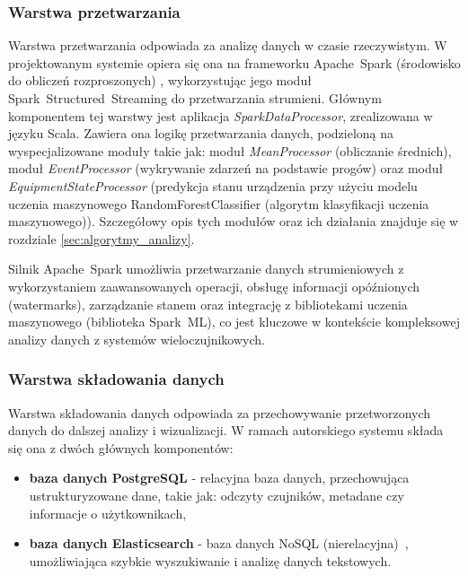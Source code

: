 \subsubsection{Warstwa przetwarzania}
\label{subsubsec:warstwa_przetwarzania}

Warstwa przetwarzania odpowiada za analizę danych w czasie rzeczywistym. W projektowanym systemie opiera się ona na frameworku \mbox{Apache Spark} (środowisko do obliczeń rozproszonych) \cite{spark_streaming}, wykorzystując jego moduł \mbox{Spark Structured Streaming} do przetwarzania strumieni. Głównym komponentem tej warstwy jest aplikacja \textit{\mbox{SparkDataProcessor}}, zrealizowana w języku Scala. Zawiera ona logikę przetwarzania danych, podzieloną na wyspecjalizowane moduły takie jak: moduł \mbox{\textit{MeanProcessor}} (obliczanie średnich), moduł \textit{\mbox{EventProcessor}} (wykrywanie zdarzeń na podstawie progów) oraz moduł \textit{\mbox{EquipmentStateProcessor}} (predykcja stanu urządzenia przy użyciu modelu uczenia maszynowego \mbox{RandomForestClassifier} (algorytm klasyfikacji uczenia maszynowego)). Szczegółowy opis tych modułów oraz ich działania znajduje się w rozdziale \ref{sec:algorytmy_analizy}.

Silnik \mbox{Apache Spark} umożliwia przetwarzanie danych strumieniowych z wykorzystaniem zaawansowanych operacji, obsługę informacji opóźnionych (watermarks), zarządzanie stanem oraz integrację z bibliotekami uczenia maszynowego (biblioteka \mbox{Spark ML}), co jest kluczowe w kontekście kompleksowej analizy danych z systemów wieloczujnikowych.

\newpage


\subsubsection{Warstwa składowania danych}
\label{subsubsec:warstwa_skladowania}

Warstwa składowania danych odpowiada za przechowywanie przetworzonych danych do dalszej analizy i wizualizacji. W ramach autorskiego systemu składa się ona z dwóch głównych komponentów:

\begin{itemize}
    \item \textbf{baza danych PostgreSQL} - relacyjna baza danych, przechowująca ustrukturyzowane dane, takie jak: odczyty czujników, metadane czy informacje o użytkownikach,
    \item \textbf{baza danych Elasticsearch} - baza danych \mbox{NoSQL} (nierelacyjna)~\cite{nosql_definition}, umożliwiająca szybkie wyszukiwanie i analizę danych tekstowych.
\end{itemize}

